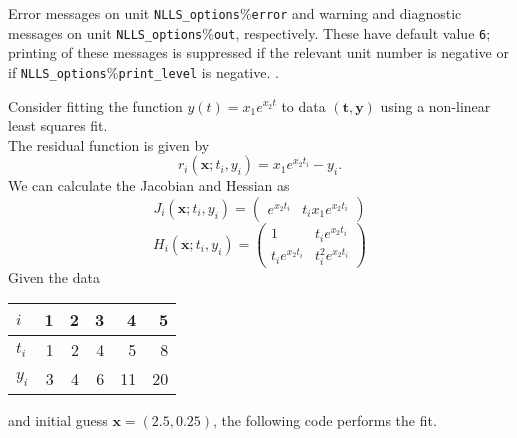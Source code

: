 \documentclass{spec}
\newcommand{\vx}{ {\bm x} } %
\begin{document}
\hslgeneral


\hslio
   Error messages on unit {\tt NLLS\_options$\%$error} and warning
   and diagnostic messages on unit {\tt NLLS\_options$\%$out},
   respectively. These have default value {\tt 6};
   printing of these messages is suppressed if the relevant unit number
   is negative or if {\tt NLLS\_options$\%$print\_level} is negative.
.

\hslmethod
\label{method}


\hslexample
Consider fitting the function $y(t) = x_1e^{x_2 t}$ to data $(\bm{t}, \bm{y})$
using a non-linear least squares fit.\\
The residual function is given by
$$
   r_i(\vx; t_i, y_i) = x_1 e^{x_2 t_i} - y_i.
$$
We can calculate the Jacobian and Hessian as
$$
   J_i(\vx; t_i, y_i) = \left(\begin{array}{cc}
      e^{x_2 t_i} &
      t_i x_1 e^{x_2 t_i}
      \end{array}\right)
$$
$$
   H_i(\vx; t_i, y_i) = \left(\begin{array}{cc}
      1                 & t_i e^{x_2 t_i}    \\
      t_i e^{x_2 t_i}   & t_i^2 e^{x_2 t_i}
   \end{array}\right)
$$
Given the data
\begin{center}
   \begin{tabular}{l|*{5}{r}}
      $i$   & 1 & 2 & 3  & 4  & 5 \\
      \hline
      $t_i$ & 1 & 2 & 4  & 5  & 8 \\
      $y_i$ & 3 & 4 & 6 & 11 & 20
   \end{tabular}
\end{center}
and initial guess $\vx = (2.5, 0.25)$, the following code performs the fit.


\end{document}

